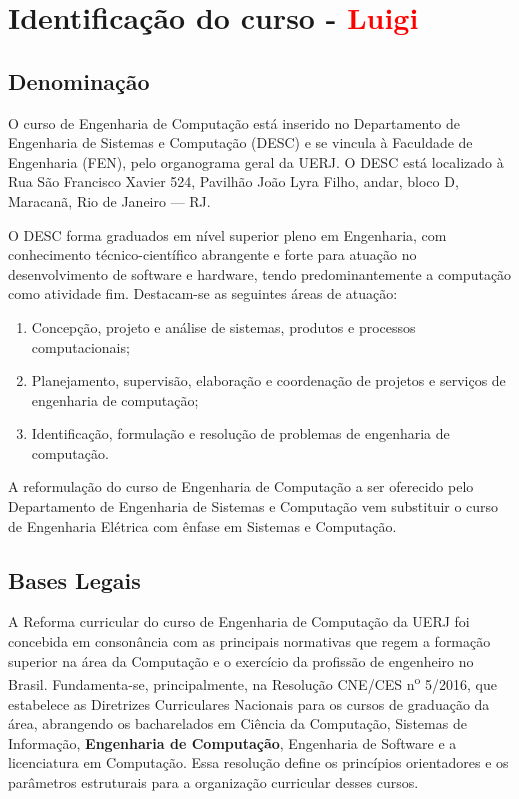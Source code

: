 \chapter{Identificação do curso - \textcolor{red}{Luigi}}

\section{Denominação}

O curso de Engenharia de Computação está inserido no Departamento de Engenharia de Sistemas e Computação (DESC) e se vincula à Faculdade de Engenharia (FEN), pelo organograma geral da UERJ. O DESC está localizado à Rua São Francisco Xavier 524, Pavilhão João Lyra Filho,  andar, bloco D, Maracanã, Rio de Janeiro –-- RJ.

O DESC forma graduados em nível superior pleno em Engenharia, com conhecimento técnico-científico abrangente e forte para atuação no desenvolvimento de software e hardware, tendo predominantemente a computação como atividade fim. Destacam-se as seguintes áreas de atuação:

\begin{enumerate}
    \item Concepção, projeto e análise de sistemas, produtos e processos computacionais;
    \item Planejamento, supervisão, elaboração e coordenação de projetos e serviços de engenharia de computação;
    \item Identificação, formulação e resolução de problemas de engenharia de computação.
\end{enumerate}

A reformulação do curso de Engenharia de Computação a ser oferecido pelo Departamento de Engenharia de Sistemas e Computação vem substituir o curso de Engenharia Elétrica com ênfase em Sistemas e Computação.

\section{Bases Legais}

A Reforma curricular do curso de Engenharia de Computação da UERJ foi concebida em consonância com as principais normativas que regem a formação superior na área da Computação e o exercício da profissão de engenheiro no Brasil. Fundamenta-se, principalmente, na Resolução CNE/CES n\textsuperscript{o} 5/2016, que estabelece as Diretrizes Curriculares Nacionais para os cursos de graduação da área, abrangendo os bacharelados em Ciência da Computação, Sistemas de Informação, \textbf{Engenharia de Computação}, Engenharia de Software e a licenciatura em Computação. Essa resolução define os princípios orientadores e os parâmetros estruturais para a organização curricular desses cursos.

